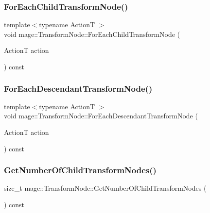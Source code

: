 \subsubsection{\texorpdfstring{For\+Each\+Child\+Transform\+Node()}{ForEachChildTransformNode()}}
{\footnotesize\ttfamily template$<$typename ActionT $>$ \\
void mage\+::\+Transform\+Node\+::\+For\+Each\+Child\+Transform\+Node (\begin{DoxyParamCaption}\item[{ActionT}]{action }\end{DoxyParamCaption}) const}

\hypertarget{classmage_1_1_transform_node_a7a052715d9591defa06e494017539711}{}\label{classmage_1_1_transform_node_a7a052715d9591defa06e494017539711} 
\subsubsection{\texorpdfstring{For\+Each\+Descendant\+Transform\+Node()}{ForEachDescendantTransformNode()}}
{\footnotesize\ttfamily template$<$typename ActionT $>$ \\
void mage\+::\+Transform\+Node\+::\+For\+Each\+Descendant\+Transform\+Node (\begin{DoxyParamCaption}\item[{ActionT}]{action }\end{DoxyParamCaption}) const}

\hypertarget{classmage_1_1_transform_node_af59a8f816e12adb2e3fd7277abf7691a}{}\label{classmage_1_1_transform_node_af59a8f816e12adb2e3fd7277abf7691a} 
\subsubsection{\texorpdfstring{Get\+Number\+Of\+Child\+Transform\+Nodes()}{GetNumberOfChildTransformNodes()}}
{\footnotesize\ttfamily size\+\_\+t mage\+::\+Transform\+Node\+::\+Get\+Number\+Of\+Child\+Transform\+Nodes (\begin{DoxyParamCaption}{ }\end{DoxyParamCaption}) const}

